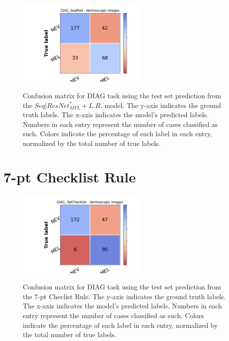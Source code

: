 \subsection{\texorpdfstring{}{TEXT}}
\begin{figure}[ht]
\centering
{\includegraphics[width =2.5in]{images/appendice/resnet+lr/DIAG_CM_SeqMod.png}}
\caption{Confusion matrix for DIAG task using the test set prediction
from the $Seq|ResNet^*_{MTL}+L.R.$ model. The y-axis indicates the ground truth labels. The x-axis indicates the model’s predicted labels. Numbers in each entry represent
the number of cases classified as such. Colors indicate the percentage of each
label in each entry, normalized by the total number of true labels.}
\label{SeqresNet+lrCM}
\end{figure}
\clearpage
\section{7-pt Checklist Rule}
\begin{figure}[ht]
\centering
{\includegraphics[width =2.5in]{images/appendice/DIAG_CM_7pt_trueC.png}}
\caption{Confusion matrix for DIAG task using the test set prediction
from the 7-pt Checlist Rule. The y-axis indicates the ground truth labels. The x-axis indicates the model’s predicted labels. Numbers in each entry represent
the number of cases classified as such. Colors indicate the percentage of each
label in each entry, normalized by the total number of true labels.}
\label{7ptCm}
\end{figure}